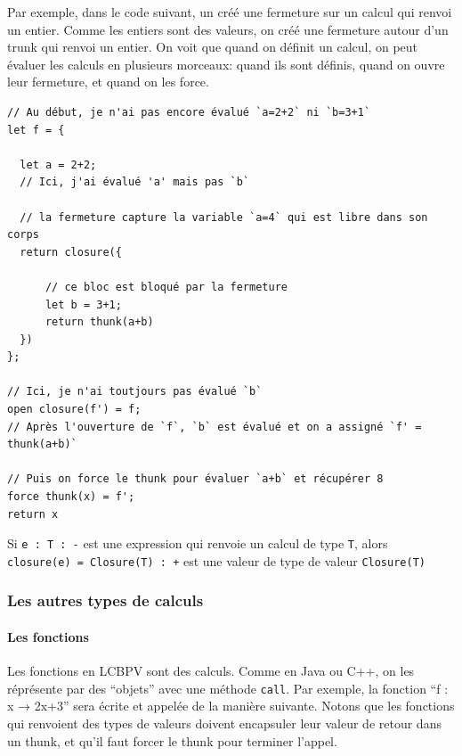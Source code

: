 \documentclass[12pt]{article}
\begin{document}
Par exemple, dans le code suivant, un créé une fermeture sur un calcul
qui renvoi un entier. Comme les entiers sont des valeurs, on créé une
fermeture autour d'un trunk qui renvoi un entier. On voit que quand on
définit un calcul, on peut évaluer les calculs en plusieurs morceaux:
quand ils sont définis, quand on ouvre leur fermeture, et quand on les
force.

\begin{verbatim}
// Au début, je n'ai pas encore évalué `a=2+2` ni `b=3+1`
let f = {

  let a = 2+2;
  // Ici, j'ai évalué 'a' mais pas `b`
    
  // la fermeture capture la variable `a=4` qui est libre dans son corps 
  return closure({
  
      // ce bloc est bloqué par la fermeture
      let b = 3+1;
      return thunk(a+b)
  })
};
  
// Ici, je n'ai toutjours pas évalué `b`
open closure(f') = f;
// Après l'ouverture de `f`, `b` est évalué et on a assigné `f' = thunk(a+b)` 
  
// Puis on force le thunk pour évaluer `a+b` et récupérer 8
force thunk(x) = f';
return x
\end{verbatim}

Si \texttt{e\ :\ T\ :\ -} est une expression qui renvoie un calcul de
type \texttt{T}, alors \texttt{closure(e)\ =\ Closure(T)\ :\ +} est une
valeur de type de valeur \texttt{Closure(T)}

\hypertarget{les-autres-types-de-calculs}{%
      \subsubsection*{Les autres types de
            calculs}\label{les-autres-types-de-calculs}}

\hypertarget{les-fonctions}{%
      \paragraph*{Les fonctions}\label{les-fonctions}}

Les fonctions en LCBPV sont des calculs. Comme en Java ou C++, on les
réprésente par des ``objets'' avec une méthode \texttt{call}. Par
exemple, la fonction ``f : x → 2x+3'' sera écrite et appelée de la
manière suivante. Notons que les fonctions qui renvoient des types de
valeurs doivent encapsuler leur valeur de retour dans un thunk, et qu'il
faut forcer le thunk pour terminer l'appel.
\end{document}

